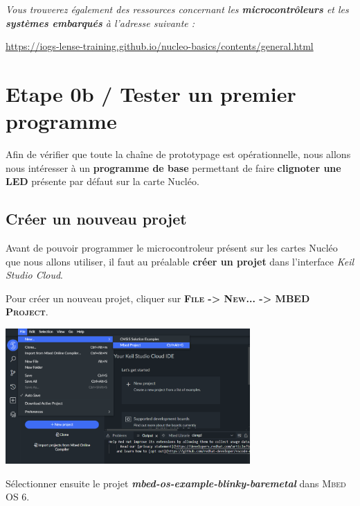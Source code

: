 \documentclass[a4paper,11pt,titlepage]{article} %
\begin{document}
\bigskip 

\textit{Vous trouverez également des ressources concernant les \textbf{microcontrôleurs} et les \textbf{systèmes embarqués} à l'adresse suivante :}

\href{https://iogs-lense-training.github.io/nucleo-basics/contents/general.html}{https://iogs-lense-training.github.io/nucleo-basics/contents/general.html}


\cleardoublepage
\section{Etape 0b / Tester un premier programme}

Afin de vérifier que toute la chaîne de prototypage est opérationnelle, nous allons nous intéresser à un \textbf{programme de base} permettant de faire \textbf{clignoter une LED} présente par défaut sur la carte Nucléo.

\subsection{Créer un nouveau projet}

Avant de pouvoir programmer le microcontroleur présent sur les cartes Nucléo que nous allons utiliser, il faut au préalable \textbf{créer un projet} dans l'interface \textsl{Keil Studio Cloud}.

Pour créer un nouveau projet, cliquer sur \textsc{\textbf{File -> New... -> MBED Project}}.

\begin{center}
	\includegraphics[width=0.7\textwidth]{images/keil_cloud_new_project_mbed.png}
\end{center}

Sélectionner ensuite le projet \textbf{\textsl{mbed-os-example-blinky-baremetal}} dans \textsc{Mbed OS 6}.
\end{document}
